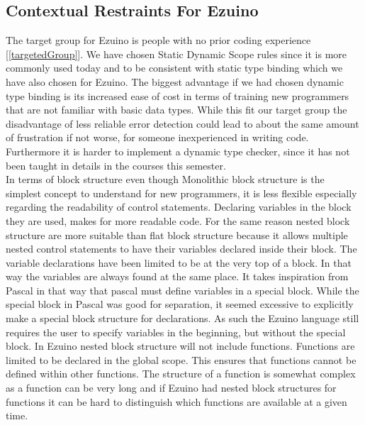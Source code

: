 \subsection{Contextual Restraints For Ezuino}
The target group for Ezuino is people with no prior coding experience [\ref{targetedGroup}]. We have chosen Static Dynamic Scope rules since it is more commonly used today and to be consistent with static type binding which we have also chosen for Ezuino. The biggest advantage if we had chosen dynamic type binding is its increased ease of cost in terms of training new programmers that are not familiar with basic data types. While this fit our target group the disadvantage of less reliable error detection could lead to about the same amount of frustration if not worse, for someone inexperienced in writing code. Furthermore it is harder to implement a dynamic type checker, since it has not been taught in details in the courses this semester. \\
In terms of block structure even though Monolithic block structure is the simplest concept to understand for new programmers, it is less flexible especially regarding the readability of control statements. Declaring variables in the block they are used, makes for more readable code. For the same reason nested block structure are more suitable than flat block structure because it allows multiple nested control statements to have their variables declared inside their block. 
The variable declarations have been limited to be at the very top of a block. In that way the variables are always found at the same place. It takes inspiration from Pascal in that way that pascal must define variables in a special block. While the special block in Pascal was good for separation, it seemed excessive to explicitly make a special block structure for declarations. As such the Ezuino language still requires the user to specify variables in the beginning, but without the special block.
In Ezuino nested block structure will not include functions. Functions are limited to be declared in the global scope. This ensures that functions cannot be defined within other functions. The structure of a function is somewhat complex as a function can be very long and if Ezuino had nested block structures for functions it can be hard to distinguish which functions are available at a given time.

